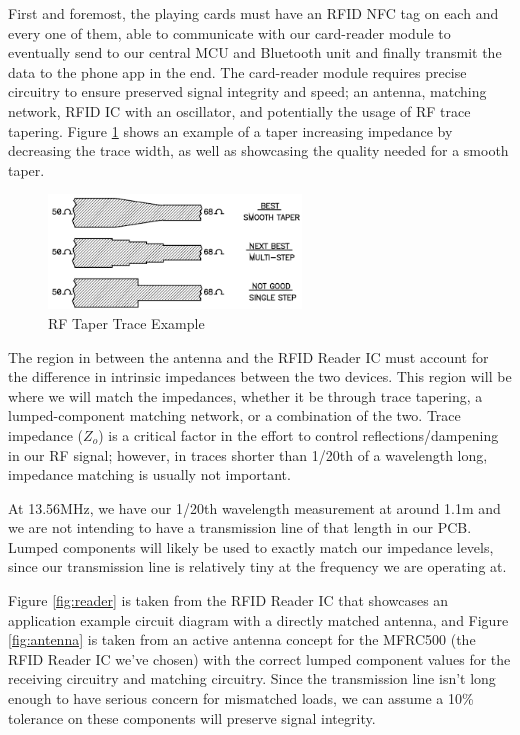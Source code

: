 \documentclass[12pt]{article}
\begin{document}
First and foremost, the playing cards must have an RFID NFC tag on each and every one of them, able to communicate with our card-reader module to eventually send to our central MCU and Bluetooth unit and finally transmit the data to the phone app in the end. The card-reader module requires precise circuitry to ensure preserved signal integrity and speed; an antenna, matching network, RFID IC with an oscillator, and potentially the usage of RF trace tapering. Figure \ref{fig:taper} shows an example of a taper increasing impedance by decreasing the trace width, as well as showcasing the quality needed for a smooth taper.

\begin{figure}[!h]
	\centering
	\includegraphics[width=0.6\textwidth]{image6.png}
	\caption{RF Taper Trace Example}
	\label{fig:taper}
\end{figure}

The region in between the antenna and the RFID Reader IC must account for the difference in intrinsic impedances between the two devices. This region will be where we will match the impedances, whether it be through trace tapering, a lumped-component matching network, or a combination of the two. Trace impedance ($Z_o$) is a critical factor in the effort to control reflections/dampening in our RF signal; however, in traces shorter than 1/20th of a wavelength long, impedance matching is usually not important. 

At 13.56MHz, we have our 1/20th wavelength measurement at around 1.1m and we are not intending to have a transmission line of that length in our PCB. Lumped components will likely be used to exactly match our impedance levels, since our transmission line is relatively tiny at the frequency we are operating at. 

Figure \ref{fig:reader} is taken from the RFID Reader IC that showcases an application example circuit diagram with a directly matched antenna, and Figure \ref{fig:antenna} is taken from an active antenna concept for the MFRC500 (the RFID Reader IC we've chosen) with the correct lumped component values for the receiving circuitry and matching circuitry. Since the transmission line isn't long enough to have serious concern for mismatched loads, we can assume a 10\% tolerance on these components will preserve signal integrity.
\end{document}
